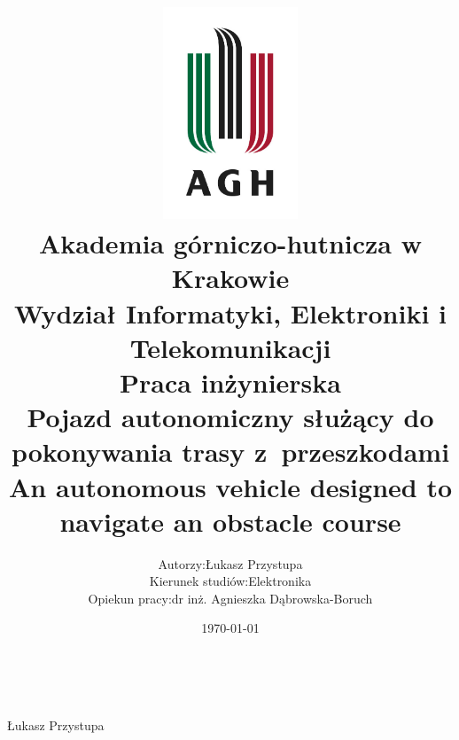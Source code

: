 \documentclass[12pt]{article}
\title{
    \includegraphics[width = 0.3\textwidth]{agh_logo.jpg}\\
    \textbf{Akademia górniczo-hutnicza w Krakowie}\\
    Wydział Informatyki, Elektroniki i  Telekomunikacji\\\vspace{2cm}
    \textbf{Praca inżynierska}\\
    Pojazd autonomiczny służący do pokonywania trasy z~przeszkodami\\\vspace{1cm}
    \small{An autonomous vehicle designed to navigate an obstacle course}
}
\author{
    \begin{tabularx}{\textwidth}{l l}
    Autorzy: &Łukasz Przystupa\\
    Kierunek studiów: & Elektronika\\
    Opiekun pracy: &dr inż. Agnieszka Dąbrowska-Boruch
    \end{tabularx}
}
\date{\vspace{2cm}\today}
\numberwithin{equation}{section}
\begin{document}
    \begin{titlepage}
        \maketitle
        \thispagestyle{empty}
        \newpage
        \
        \thispagestyle{empty}
    \end{titlepage}

        
        \tableofcontents
        \newpage
    
    
    
    
    
    
    
    

    \vfill
    \begin{flushright}
        Łukasz Przystupa
    \end{flushright}

    \newpage
    \nocite{*}
    \printbibliography
\end{document}
